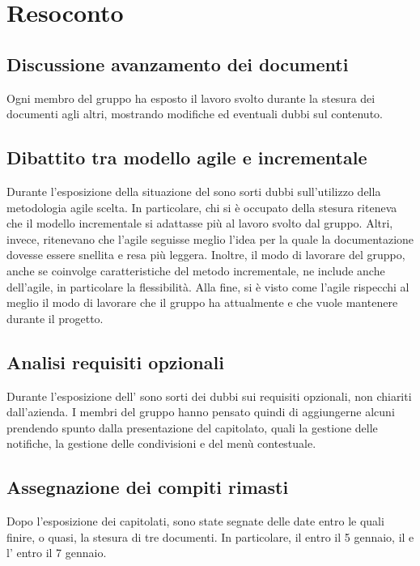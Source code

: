 \newpage




\section{Resoconto}

\subsection{Discussione avanzamento dei documenti}

Ogni membro del gruppo ha esposto il lavoro svolto durante la stesura dei documenti agli altri, mostrando modifiche ed eventuali dubbi sul contenuto. 

\subsection{Dibattito tra modello agile e incrementale}

Durante l'esposizione della situazione del \PdP{} sono sorti dubbi sull'utilizzo della metodologia agile scelta. In particolare, chi si è occupato della stesura riteneva che il modello incrementale si adattasse più al lavoro svolto dal gruppo. Altri, invece, ritenevano che l'agile seguisse meglio l'idea per la quale la documentazione dovesse essere snellita e resa più leggera. Inoltre, il modo di lavorare del gruppo, anche se coinvolge caratteristiche del metodo incrementale, ne include anche dell'agile, in particolare la flessibilità. Alla fine, si è visto come l'agile rispecchi al meglio il modo di lavorare che il gruppo ha attualmente e che vuole mantenere durante il progetto.

\subsection{Analisi requisiti opzionali}

Durante l'esposizione dell'\AdR{} sono sorti dei dubbi sui requisiti opzionali, non chiariti dall'azienda. I membri del gruppo hanno pensato quindi di aggiungerne alcuni prendendo spunto dalla presentazione del capitolato, quali la gestione delle notifiche, la gestione delle condivisioni e del menù contestuale. 

\subsection{Assegnazione dei compiti rimasti}

Dopo l'esposizione dei capitolati, sono state segnate delle date entro le quali finire, o quasi, la stesura di tre documenti. In particolare, il \PdP{} entro il 5 gennaio, il \PdQ{} e l'\AdR{} entro il 7 gennaio. 


